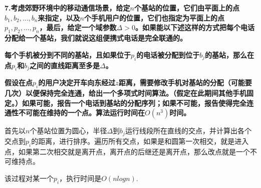 
\chapter{}
\textbf{
7.考虑郊野环境中的移动通信场景，给定$n$个基站的位置，它们由平面上的点$b_1,b_2,...,b_n$来指定，以及$n$个手机用户的位置，它们也指定为平面上的点$p_1,p_2,...,p_n$，最后，给定一个域参数$\Delta>0$。如果能以下述这样的方式把每个电话分配给一个基站，我们就说这组便携式电话是完全联通的。
}

\textbf{每个手机被分到不同的基站，且如果位于$p_i$的电话被分配到位于$b_j$的基站，那么在点$p_i$和$b_j$之间的直线距离至多是$\Delta$。}

\textbf{假设在点$p_i$的用户决定开车向东经过$z$距离，需要修改手机对基站的分配（可能要几次）以便保持完全连通，给出一个多项式时间算法。（假定在此期间其他手机固定。）如果可能，报告一个电话到基站的分配序列；如果不可能，报告使得完全连通性不可能在维持的一个点。算法运行时间在$O(n^3)$时间。}

首先以$n$个基站位置为圆心，半径$\Delta$到$b_j$运行线段所在直线的交点，并计算出各个交点到$p_i$的距离，进行排序。遍历所有交点，如果是和圆第一次相交，就是进入点，如果第二次相交就是离开点，离开点的后继还是离开点，那么改点就是一个不可维持点。

该过程对某一个$p_i$，执行时间是$O(nlog n)$.


